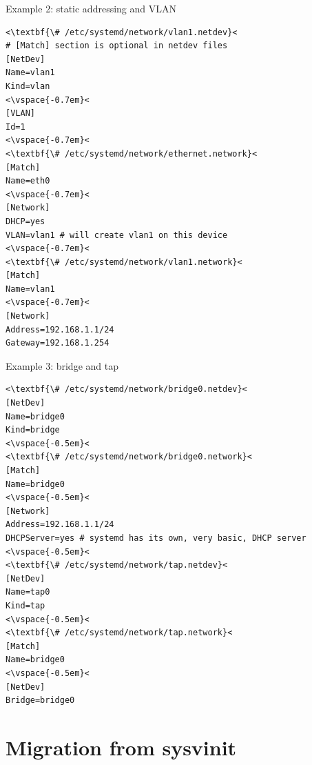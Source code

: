 \documentclass[11pt,final,usepdftitle=false]{beamer}
\begin{document}
\begin{frame}[fragile]{Example 2: static addressing and VLAN}
\begin{lstlisting}[basicstyle=\ttfamily\footnotesize,escapeinside={<<}]
<\textbf{\# /etc/systemd/network/vlan1.netdev}<
# [Match] section is optional in netdev files
[NetDev]
Name=vlan1
Kind=vlan
<\vspace{-0.7em}<
[VLAN]
Id=1
<\vspace{-0.7em}<
<\textbf{\# /etc/systemd/network/ethernet.network}<
[Match]
Name=eth0
<\vspace{-0.7em}<
[Network]
DHCP=yes
VLAN=vlan1 # will create vlan1 on this device
<\vspace{-0.7em}<
<\textbf{\# /etc/systemd/network/vlan1.network}<
[Match]
Name=vlan1
<\vspace{-0.7em}<
[Network]
Address=192.168.1.1/24
Gateway=192.168.1.254
\end{lstlisting}
\end{frame}

\begin{frame}[fragile]{Example 3: bridge and tap}
\begin{lstlisting}[basicstyle=\ttfamily\scriptsize,escapeinside={<<}]
<\textbf{\# /etc/systemd/network/bridge0.netdev}<
[NetDev]
Name=bridge0
Kind=bridge
<\vspace{-0.5em}<
<\textbf{\# /etc/systemd/network/bridge0.network}<
[Match]
Name=bridge0
<\vspace{-0.5em}<
[Network]
Address=192.168.1.1/24
DHCPServer=yes # systemd has its own, very basic, DHCP server
<\vspace{-0.5em}<
<\textbf{\# /etc/systemd/network/tap.netdev}<
[NetDev]
Name=tap0
Kind=tap
<\vspace{-0.5em}<
<\textbf{\# /etc/systemd/network/tap.network}<
[Match]
Name=bridge0
<\vspace{-0.5em}<
[NetDev]
Bridge=bridge0
\end{lstlisting}
\end{frame}

\section{Migration from sysvinit}
\end{document}
